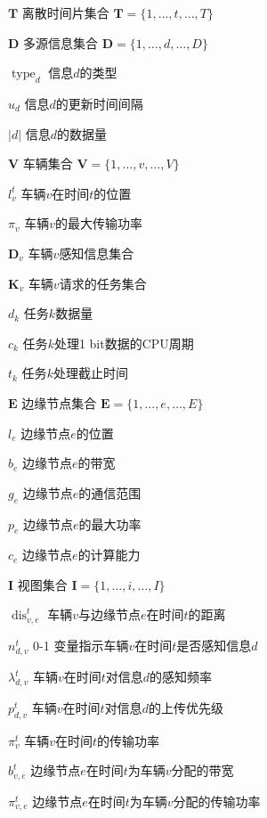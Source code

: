 \begin{denotation}[0mm][15mm]
	\item[$\mathbf{T}$] 离散时间片集合 $\mathbf{T}=\{1, \ldots, t, \ldots, T\}$
	\item[$\mathbf{D}$] 多源信息集合 $\mathbf{D}=\{1, \ldots, d, \ldots, D\}$
	\item[$\operatorname{type}_d$] 信息$d$的类型
	\item[$u_d$] 信息$d$的更新时间间隔
	\item[$\left|d\right|$] 信息$d$的数据量
	\item[$\mathbf{V}$] 车辆集合 $\mathbf{V}=\{1, \ldots, v, \ldots, V\}$
	\item[$l_{v}^{t}$] 车辆$v$在时间$t$的位置
	\item[$\pi_{v}$] 车辆$v$的最大传输功率
	\item[$\mathbf{D}_v$] 车辆$v$感知信息集合
	\item[$\mathbf{K}_{v}$] 车辆$v$请求的任务集合
	\item[$d_{k}$] 任务$k$数据量
	\item[$c_{k}$] 任务$k$处理1 bit数据的CPU周期
	\item[$t_{k}$] 任务$k$处理截止时间
	\item[$\mathbf{E}$] 边缘节点集合 $\mathbf{E}=\{1, \ldots, e, \ldots, E\}$
	\item[$l_{e}$] 边缘节点$e$的位置
	\item[$b_{e}$] 边缘节点$e$的带宽
	\item[$g_{e}$] 边缘节点$e$的通信范围
	\item[$p_{e}$] 边缘节点$e$的最大功率
	\item[$c_{e}$] 边缘节点$e$的计算能力
	\item[$\mathbf{I}$] 视图集合 $\mathbf{I}=\{1, \ldots, i, \ldots, I\}$
	\item[$\operatorname{dis}_{v, e}^{t}$] 车辆$v$与边缘节点$e$在时间$t$的距离
	\item[$n_{d, v}^t$] 0-1 变量指示车辆$v$在时间$t$是否感知信息$d$
	\item[$\lambda_{d, v}^{t}$] 车辆$v$在时间$t$对信息$d$的感知频率
	\item[$p_{d, v}^{t}$] 车辆$v$在时间$t$对信息$d$的上传优先级
	\item[$\pi_{v}^t$] 车辆$v$在时间$t$的传输功率
	\item[$b_{v, e}^{t}$] 边缘节点$e$在时间$t$为车辆$v$分配的带宽
	\item[$\pi_{v, e}^{t}$] 边缘节点$e$在时间$t$为车辆$v$分配的传输功率

\end{denotation}
